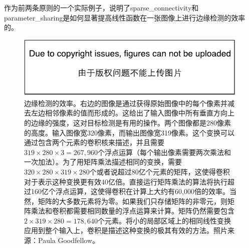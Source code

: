 作为前两条原则的一个实际例子，说明了\gls{sparse_connectivity}和\gls{parameter_sharing}是如何显著提高线性函数在一张图像上进行边缘检测的效率的。
\begin{figure}
\ifOpenSource
\centerline{\includegraphics{figure.pdf}}
\else
\centering    
{}     
\fi
\captionsetup{singlelinecheck=off}
\caption{边缘检测的效率。右边的图像是通过获得原始图像中的每个像素并减去左边相邻像素的值而形成的。这给出了输入图像中所有垂直方向上的边缘的强度，这对目标检测是有用的操作。两个图像都是280像素的高度。输入图像宽320像素，而输出图像宽319像素。这个变换可以通过包含两个元素的卷积核来描述，并且需要$319\times 280\times 3 = 267,960$个浮点运算（每个输出像素需要两次乘法和一次加法）。为了用矩阵乘法描述相同的变换，需要$320\times 280\times 319\times 280$个或者说超过80亿个元素的矩阵，这使得卷积对于表示这种变换更有效40亿倍。直接运行矩阵乘法的算法将执行超过160亿个浮点运算，这使得卷积在计算上大约有60,000倍的效率。当然，矩阵的大多数元素将为零。如果我们只存储矩阵的非零元，则矩阵乘法和卷积都需要相同数量的浮点运算来计算。矩阵仍然需要包含$2\times 319\times 280=178,640$个元素。将小的局部区域上的相同线性变换应用到整个输入上，卷积是描述这种变换的极其有效的方法。照片来源：Paula Goodfellow。}   
\label{fig:chap9_efficiency_of_edge_detection}     
\end{figure}
 
